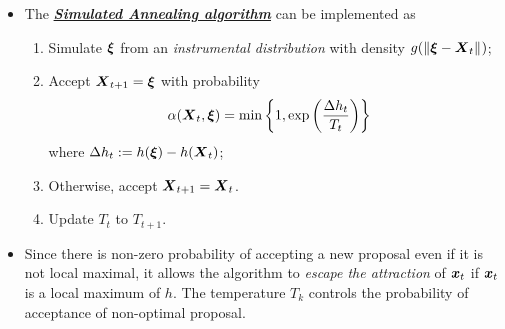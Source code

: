 \documentclass[11pt]{article}
\begin{document}
\begin{itemize}
\item The \underline{\emph{\textbf{Simulated Annealing algorithm}}} can be implemented as 
\begin{enumerate}
\item Simulate $\boldsymbol{\xi}$ from an \emph{instrumental distribution} with density $g(\left\|\boldsymbol{\xi} - \boldsymbol{X}_{t}\right\|_{})$;
\item Accept $\boldsymbol{X}_{t+1} = \boldsymbol{\xi}$ with probability
\begin{align*}
\alpha(\boldsymbol{X}_t, \boldsymbol{\xi})&= \min\left\{1, \exp\left(\frac{\Delta h_{t}}{T_{t}}\right)\right\}
\end{align*} where $\Delta h_t := h(\boldsymbol{\xi}) - h(\boldsymbol{X}_t)$;
\item Otherwise, accept $\boldsymbol{X}_{t+1} = \boldsymbol{X}_t$.
\item Update $T_{t}$ to $T_{t+1}$.
\end{enumerate}

\item  Since there is non-zero probability of accepting a new proposal even if it is not local maximal, it allows the algorithm to \emph{escape the attraction} of $\boldsymbol{x}_t$ if $\boldsymbol{x}_t$ is a local maximum of $h$. The temperature $T_{k}$ controls the probability of acceptance of non-optimal proposal.
\end{itemize}
\end{document}
